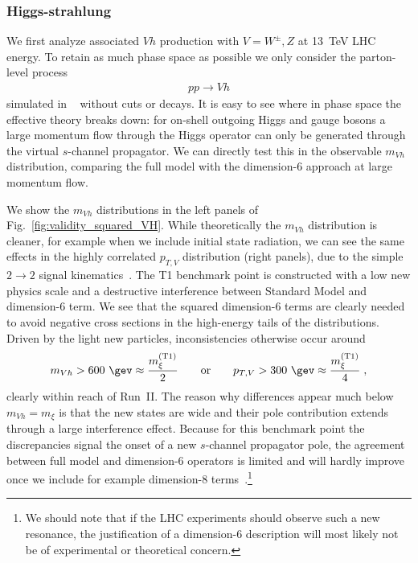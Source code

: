 \subsubsection*{Higgs-strahlung}

We first analyze associated $Vh$ production with $V =
W^\pm, Z$ at 13~TeV LHC energy. To retain as much phase space as
possible we only consider the parton-level process
%
\begin{align}
  p p \to V h
\end{align}
%
simulated in ~\cite{madgraph} without cuts or
decays. It is easy to see where in phase space the effective theory
breaks down: for on-shell outgoing Higgs and gauge bosons a large
momentum flow through the Higgs operator can only be generated through
the virtual $s$-channel propagator. We can directly test this in the
observable $m_{Vh}$ distribution, comparing the full model
with the dimension-6 approach at large momentum flow.

We show the $m_{Vh}$ distributions in the left panels of
Fig.~\ref{fig:validity_squared_VH}.  While theoretically the $m_{Vh}$
distribution is cleaner, for example when we include initial state
radiation, we can see the same effects in the highly correlated
$p_{T,V}$ distribution (right panels), due to the simple $2 \to 2$
signal kinematics~\cite{mvh,gino}.  The T1 benchmark point is constructed with a low
new physics scale and a destructive interference between Standard
Model and dimension-6 term. We see that the squared dimension-6 terms
are clearly needed to avoid negative cross sections in the high-energy
tails of the distributions. Driven by the light new particles,
inconsistencies otherwise occur around
%
\begin{align} 
m_{Vh} > 600~\gev \approx \frac{m_\xi^\text{(T1)} }2
\qquad \text{or} \qquad 
p_{T,V} > 300~\gev \approx \frac{m_\xi^\text{(T1)} }{4} \; ,
\label{eq:breakdown_vh}
\end{align}
%
clearly within reach of Run~II. The reason why differences appear much
below $m_{Vh} = m_\xi$ is that the new states are wide and their pole
contribution extends through a large interference effect. Because for
this benchmark point the discrepancies signal the onset of a new
$s$-channel propagator pole, the agreement between full model and
dimension-6 operators is limited and will hardly improve once we
include for example dimension-8 terms~\cite{kilian}.\footnote{We
  should note that if the LHC experiments should observe such a new
  resonance, the justification of a dimension-6 description will most
  likely not be of experimental or theoretical concern.}

